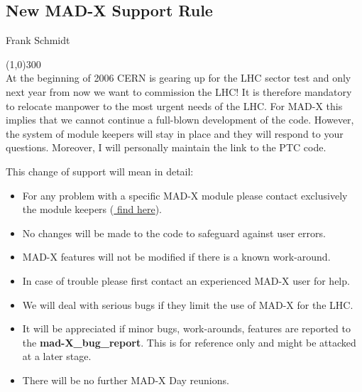 




\subsection{New MAD-X Support Rule}
Frank Schmidt 

\line(1,0){300}
\\
 At the beginning of 2006 CERN is gearing up for the LHC sector test and only next year from now we want to commission the LHC! It is therefore mandatory to relocate manpower to the most urgent needs of the LHC. For MAD-X this implies that we cannot continue a full-blown development of the code. However, the system of module keepers will stay in place and they will respond to your questions. Moreover, I will personally maintain the link to the PTC code. 

 This change of support will mean in detail:  
\begin{itemize}
	\item For any problem with a specific MAD-X module please contact exclusively the module keepers (\href{module/node1.html}{ find here}).
	\item No changes will be made to the code to safeguard against user errors.
	\item MAD-X features will not be modified if there is a known work-around.
	\item In case of trouble please first contact an experienced MAD-X user for help.
	\item We will deal with serious bugs if they limit the use of MAD-X for the LHC.
	\item It will be appreciated if minor bugs, work-arounds, features are reported to the \textbf{mad-X\_bug\_report}. This is for reference only and might be attacked at a later stage. 
	\item  There will be no further MAD-X Day reunions.
\end{itemize}

